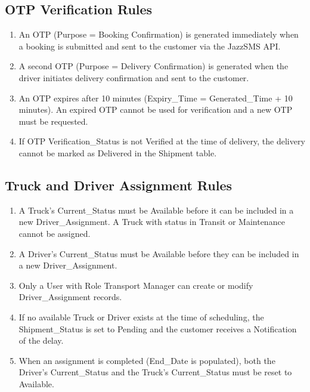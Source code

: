 \documentclass[12pt,a4paper]{report}
\begin{document}
\subsection{OTP Verification Rules}
\begin{enumerate}
    \item An OTP (Purpose = Booking Confirmation) is generated immediately when a booking is submitted and sent to the customer via the JazzSMS API.
\item A second OTP (Purpose = Delivery Confirmation) is generated when the driver initiates delivery confirmation and sent to the customer.
\item An OTP expires after 10 minutes (Expiry\_Time = Generated\_Time + 10 minutes). An expired OTP cannot be used for verification and a new OTP must be requested.
\item If OTP Verification\_Status is not Verified at the time of delivery, the delivery cannot be marked as Delivered in the Shipment table.

\end{enumerate}
\subsection{Truck and Driver Assignment Rules}
\begin{enumerate}
    \item A Truck's Current\_Status must be Available before it can be included in a new Driver\_Assignment. A Truck with status in Transit or Maintenance cannot be assigned.
 \item  A Driver's Current\_Status must be Available before they can be included in a new Driver\_Assignment.
 \item Only a User with Role Transport Manager can create or modify Driver\_Assignment records.
 \item If no available Truck or Driver exists at the time of scheduling, the Shipment\_Status is set to Pending and the customer receives a Notification of the delay.
 \item When an assignment is completed (End\_Date is populated), both the Driver's Current\_Status and the Truck's Current\_Status must be reset to Available.

\end{enumerate}
\end{document}
